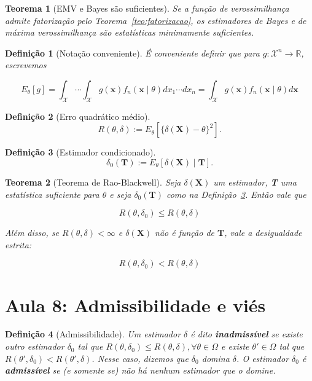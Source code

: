 \documentclass{article}
\newtheorem{theorem}{Teorema}
\newtheorem{definition}{Definição}
\begin{document}
\begin{theorem}[EMV e Bayes são suficientes]
Se a função de verossimilhança admite fatorização pelo Teorema~\ref{teo:fatorizacao}, os estimadores de Bayes e de máxima verossimilhança são estatísticas minimamente suficientes.
\end{theorem}

\begin{definition}[Notação conveniente]
É conveniente definir que para $g : \mathcal{X}^n \rightarrow \mathbb{R}$, escrevemos

\begin{equation}
    E_\theta [g] = \int_\mathcal{X} \cdots \int_\mathcal{X} g(\textbf{x}) f_n (\textbf{x} \mid \theta) d x_1 \cdots d x_n = \int_\mathcal{X} g(\textbf{x}) f_n (\textbf{x} \mid \theta) d \textbf{x} 
\end{equation}
\end{definition}

\begin{definition}[Erro quadrático médio]
\begin{equation}
    R(\theta, \delta) := E_\theta \left [ \{ \delta(\textbf{X}) - \theta \}^2 \right ].
\end{equation}
\end{definition}

\begin{definition}[Estimador condicionado]\label{def:est. cond.}
\begin{equation}
    \delta_0 (\textbf{T}) := E_\theta \left [ \delta(\textbf{X}) \mid \textbf{T} \right ].
\end{equation}
\end{definition}

\begin{theorem}[Teorema de Rao-Blackwell]
Seja $\delta(\textbf{X})$ um estimador, \textbf{T} uma estatística suficiente para $\theta$ e seja $\delta_0(\textbf{T})$ como na Definição~\ref{def:est. cond.}. Então vale que

$$R(\theta, \delta_0) \leq R(\theta, \delta)$$

Além disso, se $R(\theta, \delta) < \infty$ e $\delta (\textbf{X})$ não é função de $\textbf{T}$, vale a desigualdade estrita:

$$R(\theta, \delta_0) < R(\theta, \delta)$$
\end{theorem}

\section*{Aula 8: Admissibilidade e viés}
\label{s8}
\begin{definition}[Admissibilidade]
Um estimador $\delta$ é dito \textbf{inadmissível} se existe outro estimador $\delta_0$ tal que $R(\theta, \delta_0) \leq R(\theta, \delta), \forall \theta \in \Omega$ e existe $\theta' \in \Omega$ tal que $R(\theta', \delta_0) < R(\theta', \delta)$. Nesse caso, dizemos que $\delta_0$ domina $\delta$. O estimador $\delta_0$ é \textbf{admissível} se (e somente se) não há nenhum estimador que o domine.
\end{definition}
\end{document}
